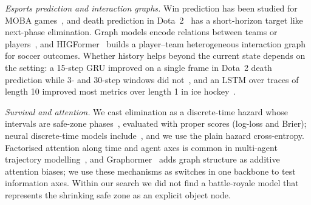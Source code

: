 \emph{Esports prediction and interaction graphs.} Win prediction has been studied for MOBA games~\cite{hodge2017mobaWinPrediction,yang2020honorKingsRealtime,junior2023lolRealtime}, and death prediction in Dota~2~\cite{katona2019dotaDeath} has a short-horizon target like next-phase elimination. Graph models encode relations between teams or players~\cite{bisberg2022gcnWp,xenopoulos2021gnnSports}, and HIGFormer~\cite{wang2025higformer} builds a player--team heterogeneous interaction graph for soccer outcomes. Whether history helps beyond the current state depends on the setting: a 15-step GRU improved on a single frame in Dota~2 death prediction while 3- and 30-step windows did not~\cite{ringer2023timeToDie2}, and an LSTM over traces of length 10 improved most metrics over length 1 in ice hockey~\cite{liu2018hockeyIJCAI}.

\emph{Survival and attention.} We cast elimination as a discrete-time hazard whose intervals are safe-zone phases~\cite{allison1982discrete,singer1993discrete}, evaluated with proper scores (log-loss and Brier); neural discrete-time models include~\cite{gensheimer2019nnetsurvival,lee2018deephit,lee2020dynamicdeephit}, and we use the plain hazard cross-entropy. Factorised attention along time and agent axes is common in multi-agent trajectory modelling~\cite{ngiam2022scenetransformer,capellera2024transportmer}, and Graphormer~\cite{ying2021graphormer} adds graph structure as additive attention biases; we use these mechanisms as switches in one backbone to test information axes. Within our search we did not find a battle-royale model that represents the shrinking safe zone as an explicit object node.
